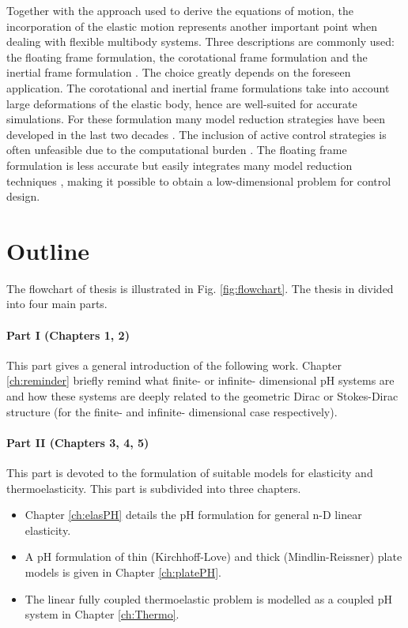 \indent Together with the approach used to derive the equations of motion, the incorporation of the elastic motion represents another important point when dealing with flexible multibody systems. Three descriptions are commonly used: the floating frame formulation, the corotational frame formulation and the inertial frame formulation \cite{ellenbroek2018}. The choice greatly depends on the foreseen application.  The corotational and inertial frame formulations take into account large deformations of the elastic body, hence are well-suited for accurate simulations. For these formulation many model reduction strategies have been developed in the last two decades \cite{rong2019}. The inclusion of active control strategies is often unfeasible due to the computational burden \cite{wasfy2003survey}. The floating frame formulation is less accurate but easily integrates many model reduction techniques \cite{nowakowski2012}, making it possible to obtain a low-dimensional problem for control design. \\


\section{Outline}

The flowchart of thesis is illustrated in Fig. \ref{fig:flowchart}. The thesis in divided into four main parts.

\paragraph{Part I (Chapters 1, 2)}
This part gives a general introduction of the following work. Chapter \ref{ch:reminder} briefly remind what  finite- or infinite- dimensional pH systems are and how these systems are deeply related to the geometric Dirac  or Stokes-Dirac structure (for the finite- and infinite- dimensional case respectively).

\paragraph{Part II (Chapters 3, 4, 5)}
This part is devoted to the formulation of suitable models for elasticity and thermoelasticity. This part is subdivided into three chapters.
\begin{itemize}
\item Chapter \ref{ch:elasPH} details the pH formulation for general n-D linear elasticity.
\item A pH formulation of thin (Kirchhoff-Love) and thick (Mindlin-Reissner) plate models is given in Chapter \ref{ch:platePH}.
\item The linear fully coupled thermoelastic problem is modelled as a coupled pH system in Chapter \ref{ch:Thermo}. 
\end{itemize}


